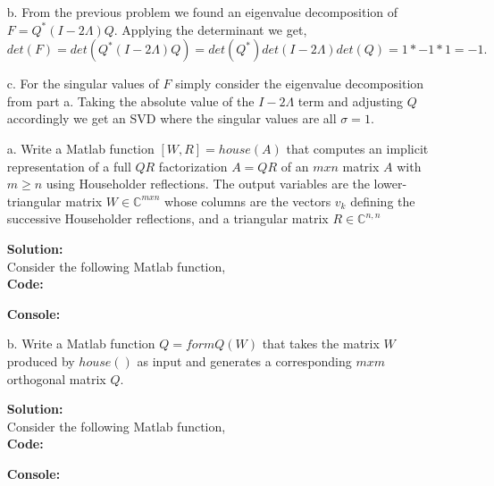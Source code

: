 \documentclass[12pt]{article}
\makeatletter
\theoremstyle{homework}
\newenvironment{exercise}[1]
{\def\@currentlabel{#1}\exercisecore}
{\endexercisecore}
\newcommand{\localhead}[1]{\par\smallskip\noindent\textbf{#1}\nobreak\\}%
\newcommand\solution{\localhead{Solution:}}
\newcommand{\Cplx}{\ensuremath{\mathbb C}}
\let\CC\Cplx
\makeatother
\begin{document}
\begin{exercise}{10.1}
\begin{enumerate}
    \item[b.] From the previous problem we found an eigenvalue decomposition of $F =  Q^*(I - 2\Lambda) Q$. Applying the determinant we get, 
    \begin{equation*}
      det(F) = det( Q^*(I - 2\Lambda) Q) = det(Q^*)det(I - 2\Lambda)det(Q) = 1*-1*1 = -1.
    \end{equation*}  

    \vspace{.15in}
    \item[c.] For the singular values of $F$ simply consider the eigenvalue decomposition from part a. Taking the absolute value of the $I - 2\Lambda$ term
    and adjusting $Q$ accordingly we get an SVD where the singular values are all $\sigma = 1$.
  




  \end{enumerate}
\end{exercise}


\vspace{1in}


\begin{exercise}{10.2}
  \begin{enumerate}
    \item[a.] Write a Matlab function $[W,R] = house(A)$ that computes an implicit representation of a full $QR$ factorization 
    $A = QR$ of an $mxn$ matrix $A$ with $m \geq n$ using Householder reflections. The output variables are the lower-triangular matrix
    $W \in \CC^{mxn}$ whose columns are the vectors $v_k$ defining the successive Householder reflections, and a triangular matrix $R \in \CC^{n,n}$\\
    \solution Consider the following Matlab function,\\
    \textbf{Code:}
  \begin{center}
    
  \end{center} 
  \textbf{Console:}
  \begin{center}
    
  \end{center} 
    \vspace{.5in}


    \item[b.] Write a Matlab function $Q = formQ(W)$ that takes the matrix $W$ produced by $house()$ as input and 
    generates a corresponding $mxm$ orthogonal matrix $Q$.\\
    \solution Consider the following Matlab function,\\
    \textbf{Code:}
    \begin{center}
    
    \end{center} 
    \textbf{Console:}
    \begin{center}
      
    \end{center} 
      \vspace{.5in}
  \end{enumerate}
\end{exercise}
\vspace{1in}
  
\end{document}
